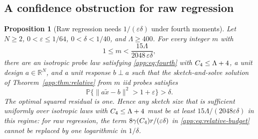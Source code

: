 \documentclass[11pt,a4paper]{article}
\newtheorem{proposition}[theorem]{Proposition}
\theoremstyle{definition}\newtheorem{definition}[theorem]{Definition}
\theoremstyle{remark}\newtheorem{remark}[theorem]{Remark}
\numberwithin{equation}{section}
\newcommand{\R}{\mathbb R}\newcommand{\E}{\mathbb E}\newcommand{\Pp}{\mathbb P}
\newcommand{\norm}[1]{\lVert#1\rVert}\newcommand{\ip}[2]{\langle#1,#2\rangle}
\begin{document}
\subsection{A confidence obstruction for raw regression}
\begin{proposition}[Raw regression needs $1/(\varepsilon\delta)$ under fourth moments]
\label{app:prop:regression-lower}
Let $N\ge2$, $0<\varepsilon\le1/64$, $0<\delta<1/40$, and $\Lambda\ge400$.
For every integer $m$ with
\[
 1\le m<\frac{15\Lambda}{2048\,\varepsilon\delta},
\]
there are an isotropic probe law satisfying \eqref{app:eq:fourth} with
${C_4}\le\Lambda+4$, a unit design $a\in\R^N$, and a unit response
$b\perp a$ such that the sketch-and-solve solution of
Theorem~\ref{app:thm:relative} from $m$ iid probes satisfies
\[
 \Pp\bigl\{\norm{a\widetilde x-b}^2>1+\varepsilon\bigr\}>\delta.
\]
The optimal squared residual is one. Hence any sketch size that is
sufficient uniformly over isotropic laws with ${C_4}\le\Lambda+4$ must be
at least $15\Lambda/(2048\varepsilon\delta)$ in this regime: for raw
regression, the term $8\gamma({C_4})r/(\varepsilon\delta)$ in
\eqref{app:eq:relative-budget} cannot be replaced by one logarithmic in
$1/\delta$.
\end{proposition}
\end{document}

